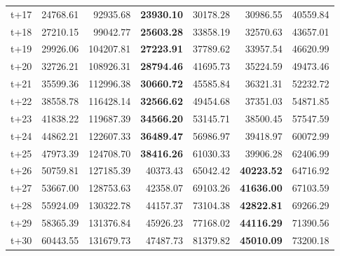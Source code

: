 \begin{table}[H]
\begin{tabular}{lrrrrrr}
t+17  & 24768.61  & 92935.68  & \textbf{23930.10}  & 30178.28  & 30986.55  & 40559.84  \\
t+18  & 27210.15  & 99042.77  & \textbf{25603.28}  & 33858.19  & 32570.63  & 43657.01  \\
t+19  & 29926.06  & 104207.81  & \textbf{27223.91}  & 37789.62  & 33957.54  & 46620.99  \\
t+20  & 32726.21  & 108926.31  & \textbf{28794.46}  & 41695.73  & 35224.59  & 49473.46  \\
t+21  & 35599.36  & 112996.38  & \textbf{30660.72}  & 45585.84  & 36321.31  & 52232.72  \\
t+22  & 38558.78  & 116428.14  & \textbf{32566.62}  & 49454.68  & 37351.03  & 54871.85  \\
t+23  & 41838.22  & 119687.39  & \textbf{34566.20}  & 53145.71  & 38500.45  & 57547.59  \\
t+24  & 44862.21  & 122607.33  & \textbf{36489.47}  & 56986.97  & 39418.97  & 60072.99  \\
t+25  & 47973.39  & 124708.70  & \textbf{38416.26}  & 61030.33  & 39906.28  & 62406.99  \\
t+26  & 50759.81  & 127185.39  & 40373.43  & 65042.42  & \textbf{40223.52}  & 64716.92  \\
t+27  & 53667.00  & 128753.63  & 42358.07  & 69103.26  & \textbf{41636.00}  & 67103.59  \\
t+28  & 55924.09  & 130322.78  & 44157.37  & 73104.38  & \textbf{42822.81}  & 69266.29  \\
t+29  & 58365.39  & 131376.84  & 45926.23  & 77168.02  & \textbf{44116.29}  & 71390.56  \\
t+30  & 60443.55  & 131679.73  & 47487.73  & 81379.82  & \textbf{45010.09}  & 73200.18  \\

\bottomrule
\end{tabular}
\end{table}
